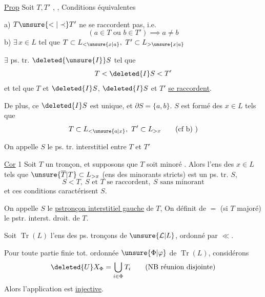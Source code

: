 \uline{Prop} Soit $T,T'$ , , Conditions équivalentes  

a) $T\unsure{<|\prec}T'$  ne se raccordent pas, i.e.
\[
(a\in T\text{ ou }b\in T')\implies a\neq b
\]
\quad b) $\exists\,x\in L$ tel que $T\subset L_{<\unsure{x|a}},\ T'\subset L_{>\unsure{x|a}}$

 $\exists$ ps. tr. $\deleted{\unsure{I}}S$ tel que
\[
T<\deleted{I}S<T'
\]
et tel que $T$ et $\deleted{I}S$, $\deleted{I}S$ et $T'$ \uline{se raccordent}.

De plus, ce $\deleted{I}S$ est unique, et $\partial S=\{a,b\}$. $S$ est formé des $x\in L$ tels que
\[
T\subset L_{<\unsure{a|x}},\ T'\subset L_{>x}\qquad\text{(cf b) )}
\]

On appelle $S$ le ps. tr. interstitiel entre $T$ et $T'$

\uline{Cor} 1 Soit $T$ un tronçon, et supposons que $T$ soit minoré . Alors l'ens des   $x\in L$ tels que $\unsure{\overline T|T}\subset L_{>x}$ (ens des minorants stricts) est un  ps. tr. $S$,  
\begingroup
\makeatletter
\tagsleft@true
\makeatother
\[
S<T,\ S\text{ et }T\text{ se raccordent},\ S\text{ sans minorant}\tag*{\(\ast\))}
\]
\endgroup
et ces conditions  caractérisent $S$.

 On appelle $S$ le \uline{pstronçon interstitiel gauche} de $T$, On définit de $=$ (si $T$ majoré) le pstr. interst. droit. de $T$.

Soit $\operatorname{Tr}(L)$ l'ens  des ps. tronçons de $\unsure{\mathcal L|L}$, ordonné par $\ll$.

Pour toute partie finie tot. ordonnée $\unsure{\Phi|\varphi}$ de $\operatorname{Tr}(L)$, considérons
\[
\deleted{U}X_{\Phi}=\bigcup_{i\in\Phi}T_i\qquad\text{(NB réunion disjointe)}
\]
Alors l'application
est \uline{injective}.

